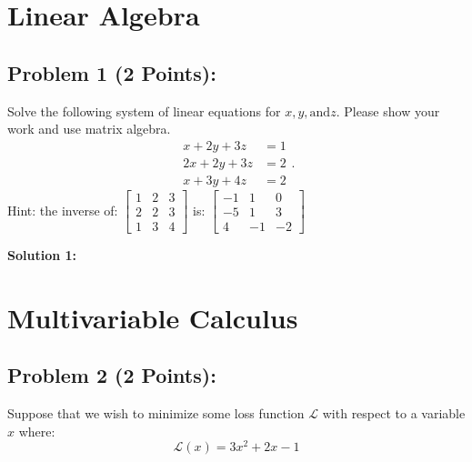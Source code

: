 \documentclass[]{article}
\begin{document}
\section{Linear Algebra}

\subsection*{Problem 1 (2 Points):}
Solve the following system of linear equations for $x, y, \text{and} z$. Please show your work and use matrix algebra.
\begin{equation*}
    \begin{split}
        x + 2y + 3z &= 1 \\
        2x + 2y + 3z &= 2 \\
        x + 3y + 4z &= 2
    \end{split}.
\end{equation*}
Hint: the inverse of:
    $\begin{bmatrix}
        1 & 2 & 3\\
        2 & 2 & 3\\
        1 & 3 & 4
        \end{bmatrix}$
    is:
    $\begin{bmatrix}
        -1 & 1 & 0\\
        -5 & 1 & 3\\
        4 & -1 & -2
        \end{bmatrix}$

\bigskip
\textbf{Solution 1:}

\clearpage
\section{Multivariable Calculus}

\subsection*{Problem 2 (2 Points):}
Suppose that we wish to minimize some loss function $\mathcal{L}$ with respect to a variable $x$ where:
$$\mathcal{L}(x) = 3x^2 + 2x - 1$$
\end{document}
